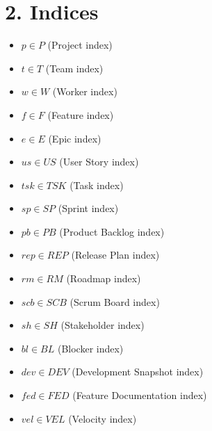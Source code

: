 \documentclass{article}
\begin{document}
\section{2. Indices}
\begin{itemize}
    \item $p \in P$ (Project index)
    \item $t \in T$ (Team index)
    \item $w \in W$ (Worker index)
    \item $f \in F$ (Feature index)
    \item $e \in E$ (Epic index)
    \item $us \in US$ (User Story index)
    \item $tsk \in TSK$ (Task index)
    \item $sp \in SP$ (Sprint index)
    \item $pb \in PB$ (Product Backlog index)
    \item $rep \in REP$ (Release Plan index)
    \item $rm \in RM$ (Roadmap index)
    \item $scb \in SCB$ (Scrum Board index)
    \item $sh \in SH$ (Stakeholder index)
    \item $bl \in BL$ (Blocker index)
    \item $dev \in DEV$ (Development Snapshot index)
    \item $fed \in FED$ (Feature Documentation index)
    \item $vel \in VEL$ (Velocity index)
\end{itemize}
\end{document}
